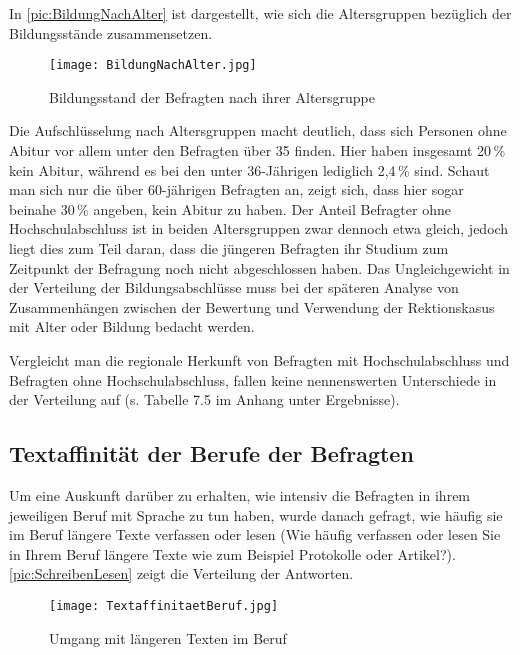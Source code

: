 In \autoref{pic:BildungNachAlter} ist dargestellt, wie sich die Altersgruppen bezüglich der Bildungsstände zusammensetzen.
\begin{figure}
\centering
\texttt{[image: BildungNachAlter.jpg]}
\caption{Bildungsstand der Befragten nach ihrer Altersgruppe}
\label{pic:BildungNachAlter}
\end{figure}
 
Die Aufschlüsselung nach Altersgruppen macht deutlich, dass sich Personen ohne Abitur vor allem unter den Befragten über 35 finden. 
Hier haben insgesamt 20\,\% kein Abitur, während es bei den unter 36-Jährigen lediglich 2,4\,\% sind. 
Schaut man sich nur die über 60-jährigen Befragten an, zeigt sich, dass hier sogar beinahe 30\,\% angeben, kein Abitur zu haben. 
Der Anteil Befragter ohne Hochschulabschluss ist in beiden Altersgruppen zwar dennoch etwa gleich, jedoch liegt dies zum Teil daran, dass die jüngeren Befragten ihr Studium zum Zeitpunkt der Befragung noch nicht abgeschlossen haben.
Das Ungleichgewicht in der Verteilung der Bildungsabschlüsse muss bei der späteren Analyse von Zusammenhängen zwischen der Bewertung und Verwendung der Rektionskasus mit Alter oder Bildung bedacht werden. 

\begin{sloppypar}
Vergleicht man die regionale Herkunft von Befragten mit Hochschulabschluss und Befragten ohne Hochschulabschluss, fallen keine nennenswerten Unterschiede in der Verteilung auf (s. Tabelle 7.5 im Anhang unter Ergebnisse). 
\end{sloppypar}

\subsection{Textaffinität der Berufe der Befragten}
\label{sec:Beruf}
Um eine Auskunft darüber zu erhalten, wie intensiv die Befragten in ihrem jeweiligen Beruf mit Sprache zu tun haben, wurde danach gefragt, wie häufig sie im Beruf längere Texte verfassen oder lesen (\glqq Wie häufig verfassen oder lesen Sie in Ihrem Beruf längere Texte wie zum Beispiel Protokolle oder Artikel?\grqq). 
\autoref{pic:SchreibenLesen} zeigt die Verteilung der Antworten. 

\begin{figure}
\centering
\texttt{[image: TextaffinitaetBeruf.jpg]}
\caption{Umgang mit längeren Texten im Beruf}
\label{pic:SchreibenLesen}
\end{figure}

